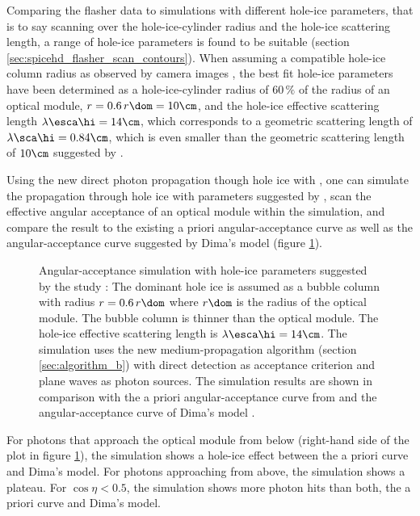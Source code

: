 Comparing the flasher data to simulations with different hole-ice parameters, that is to say scanning over the hole-ice-cylinder radius and the hole-ice scattering length, a range of hole-ice parameters is found to be suitable (section \ref{sec:spicehd_flasher_scan_contours}). When assuming a compatible hole-ice column radius as observed by camera images \cite{rongenswedishcamera}, the best fit hole-ice parameters have been determined as a hole-ice-cylinder radius of $60\,\%$ of the radius of an optical module, $r = 0.6\,r\dom = 10\cm$, and the hole-ice effective scattering length $\lambda\esca\hi = 14\cm$, which corresponds to a geometric scattering length of $\lambda\sca\hi = 0.84\cm$, which is even smaller than the geometric scattering length of $10\cm$ suggested by . \cite{martinspicehddard}

Using the new direct photon propagation though hole ice with \clsim, one can simulate the propagation through hole ice with parameters suggested by , scan the effective angular acceptance of an optical module within the simulation, and compare the result to the existing a priori angular-acceptance curve \cite{icepaper} as well as the angular-acceptance curve suggested by Dima's model \cite{flasherdataderivedicemodels} (figure \ref{fig:ku3Zie8z}).


\begin{figure}[htbp]
  \caption{Angular-acceptance simulation with hole-ice parameters suggested by the  study \cite{martinspicehddard}: The dominant hole ice is assumed as a bubble column with radius $r = 0.6\,r\dom$ where $r\dom$ is the radius of the optical module. The bubble column is thinner than the optical module. The hole-ice effective scattering length is $\lambda\esca\hi = 14\cm$. The simulation uses the new medium-propagation algorithm (section \ref{sec:algorithm_b}) with direct detection as acceptance criterion and plane waves as photon sources. The simulation results are shown in comparison with the a priori angular-acceptance curve from \cite{icepaper} and the angular-acceptance curve of Dima's model \cite{flasherdataderivedicemodels}.}
  \label{fig:ku3Zie8z}
\end{figure}

For photons that approach the optical module from below (right-hand side of the plot in figure \ref{fig:ku3Zie8z}), the simulation shows a hole-ice effect between the a priori curve and Dima's model. For photons approaching from above, the simulation shows a plateau. For $\cos\eta < 0.5$, the simulation shows more photon hits than both, the a priori curve and Dima's model.


